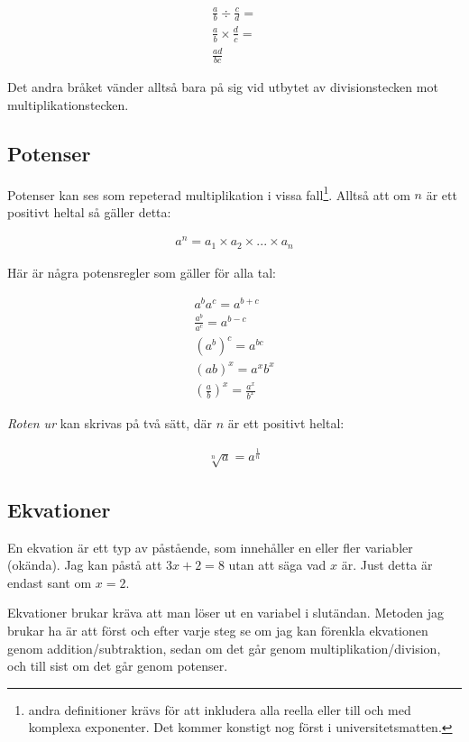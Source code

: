 \begin{align}
	\frac{a}{b} \div\frac{c}{d} = \\ 
	\frac{a}{b} \times \frac{d}{c} = \\
	\frac{ad}{bc}
\end{align}

Det andra bråket vänder alltså bara på sig vid utbytet av divisionstecken mot multiplikationstecken.

\newpage
\subsection{Potenser}

Potenser kan ses som repeterad multiplikation i vissa fall\footnote{andra definitioner krävs för att inkludera alla reella eller till och med komplexa exponenter. Det kommer konstigt nog först i universitetsmatten.}. Alltså att om $n$ är ett positivt heltal så gäller detta:

\begin{align}
	a^n = a_1 \times a_2 \times ... \times a_n
\end{align}

Här är några potensregler som gäller för alla tal:

\begin{align}
	a^ba^c = a^{b+c} \\
	\frac{a^b}{a^c} = a^{b-c} \\
	(a^b)^c=a^{bc} \\
	(ab)^x=a^xb^x \\
	\left(\frac{a}{b}\right)^x=\frac{a^x}{b^x}
\end{align}

\textit{Roten ur} kan skrivas på två sätt, där $n$ är ett positivt heltal:

\begin{align}
	\sqrt[n]{a} = a^{\frac{1}{n}}
\end{align}

\newpage
\subsection{Ekvationer}

En ekvation är ett typ av påstående, som innehåller en eller fler variabler (okända). Jag kan påstå att $3x+2 = 8$ utan att säga vad $x$ är. Just detta är endast sant om $x=2$.

Ekvationer brukar kräva att man löser ut en variabel i slutändan. Metoden jag brukar ha är att först och efter varje steg se om jag kan förenkla ekvationen genom addition/subtraktion, sedan om det går genom multiplikation/division, och till sist om det går genom potenser.

